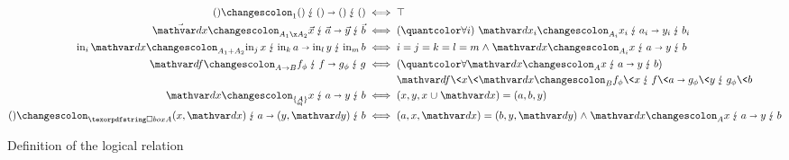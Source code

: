 \begin{figure}
  \begin{align*}
    \weirdat{\tunit}{\tuple{}}{\tuple{}}{\tuple{}}{\tuple{}}{\tuple{}}
    &\iff \top
    \\
    \weirdat{A_1 \x A_2}{\vec{\dx}}{\vec x}{\vec a}{\vec y}{\vec b}
    &\iff \fa{i} \weirdat{A_i}{\dx_i}{x_i}{a_i}{y_i}{b_i}
    \\
    \weirdat{A_1 + A_2}{\inj i \dx}{\inj j x}{\inj k a}{\inj l y}{\inj m b}
    &\iff i = j = k = l = m \wedge \weirdat{A_i}{\dx}{x}{a}{y}{b}
    \\
    \weirdat{A \to B}{\df}{f_\phi}{f}{g_\phi}{g}
    &\iff
    \fa{\weirdat{A}{\dx}{x}{a}{y}{b}} \\
    &\hphantom{{}\iff{}}
    \weirdat{B}{\df\<x\<\dx}{f_\phi\<x}{f\<a}{g_\phi\<y}{g_\phi\<b}
    \\
    \weirdat{\tseteq A}{\dx}{x}{a}{y}{b}
    &\iff (x,y,x \cup \dx) = (a,b,y)
    \\
    \weirdat{\iso A}{\tuple{}}{(x,\dx)}{a}{(y,\dy)}{b}
    &\iff (a,x,\dx) = (b,y,\dy) \wedge \weirdat{A}{\dx}{x}{a}{y}{b}
  \end{align*}
  \caption{Definition of the logical relation}
  \label{fig:logical-relation}
\end{figure}
